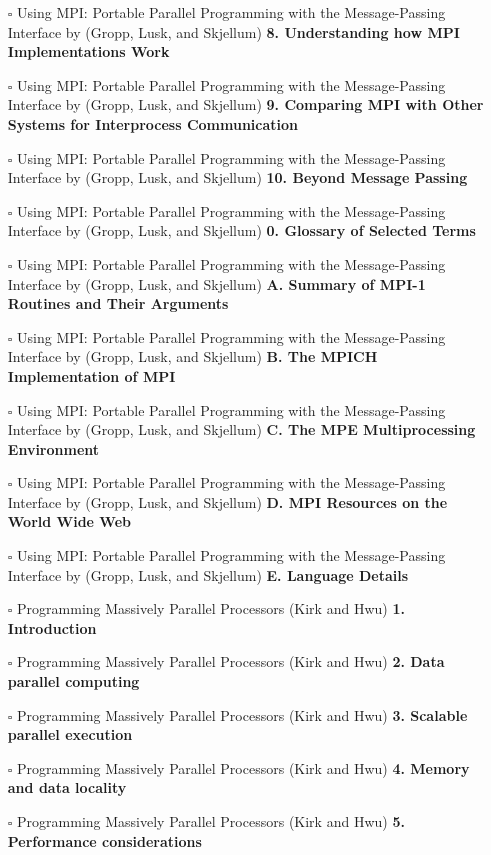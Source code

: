 \documentclass[a4, landscape, 12pt]{article}
\newcommand{\checkbox}{$\square$}%
\begin{document}
\begin{itemize}
{}
\item [\checkbox]  Using MPI: Portable Parallel Programming with the Message-Passing Interface by (Gropp, Lusk, and Skjellum) \textbf{ 8. Understanding how MPI Implementations Work
}
\item [\checkbox]  Using MPI: Portable Parallel Programming with the Message-Passing Interface by (Gropp, Lusk, and Skjellum) \textbf{ 9. Comparing MPI with Other Systems for Interprocess Communication
}
\item [\checkbox]  Using MPI: Portable Parallel Programming with the Message-Passing Interface by (Gropp, Lusk, and Skjellum) \textbf{ 10. Beyond Message Passing
}
\item [\checkbox]  Using MPI: Portable Parallel Programming with the Message-Passing Interface by (Gropp, Lusk, and Skjellum) \textbf{ 0. Glossary of Selected Terms
}
\item [\checkbox]  Using MPI: Portable Parallel Programming with the Message-Passing Interface by (Gropp, Lusk, and Skjellum) \textbf{ A. Summary of MPI-1 Routines and Their Arguments
}
\item [\checkbox]  Using MPI: Portable Parallel Programming with the Message-Passing Interface by (Gropp, Lusk, and Skjellum) \textbf{ B. The MPICH Implementation of MPI
}
\item [\checkbox]  Using MPI: Portable Parallel Programming with the Message-Passing Interface by (Gropp, Lusk, and Skjellum) \textbf{ C. The MPE Multiprocessing Environment
}
\item [\checkbox]  Using MPI: Portable Parallel Programming with the Message-Passing Interface by (Gropp, Lusk, and Skjellum) \textbf{ D. MPI Resources on the World Wide Web
}
\item [\checkbox]  Using MPI: Portable Parallel Programming with the Message-Passing Interface by (Gropp, Lusk, and Skjellum) \textbf{ E. Language Details
}
\item [\checkbox]  Programming Massively Parallel Processors (Kirk and Hwu) \textbf{ 1. Introduction
}
\item [\checkbox]  Programming Massively Parallel Processors (Kirk and Hwu) \textbf{ 2. Data parallel computing
}
\item [\checkbox]  Programming Massively Parallel Processors (Kirk and Hwu) \textbf{ 3. Scalable parallel execution
}
\item [\checkbox]  Programming Massively Parallel Processors (Kirk and Hwu) \textbf{ 4. Memory and data locality
}
\item [\checkbox]  Programming Massively Parallel Processors (Kirk and Hwu) \textbf{ 5. Performance considerations
}
\end{itemize}
\end{document}
